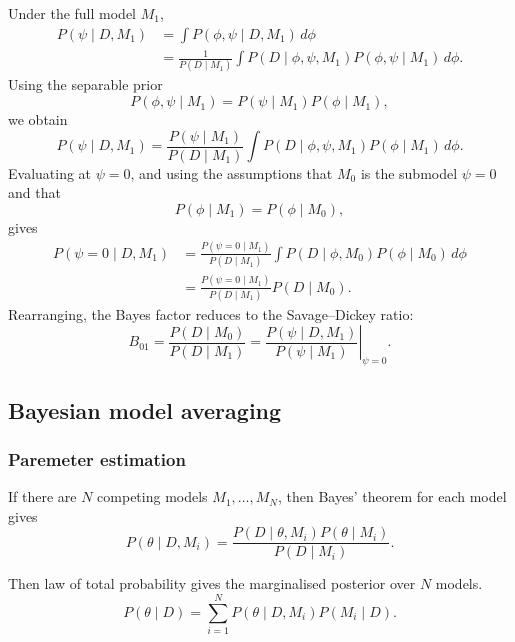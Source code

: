 \documentclass[11pt, titlepage]{article} %
\numberwithin{equation}{section}
\theoremstyle{definition}
\numberwithin{assumption}{section}
\begin{document}
Under the full model $M_1$,
\begin{align*}
    P(\psi\mid D,M_1)
    &= \int P(\phi,\psi\mid D,M_1)\,d\phi\\
    &= \frac{1}{P(D\mid M_1)}
       \int P(D\mid \phi,\psi,M_1)P(\phi,\psi\mid M_1)\,d\phi.
\end{align*}
Using the separable prior
\begin{equation*}
    P(\phi,\psi\mid M_1)=P(\psi\mid M_1)P(\phi\mid M_1),
\end{equation*}
we obtain
\begin{equation*}
    P(\psi\mid D,M_1)
    =
    \frac{P(\psi\mid M_1)}{P(D\mid M_1)}
    \int P(D\mid \phi,\psi,M_1)P(\phi\mid M_1)\,d\phi.
\end{equation*}
Evaluating at $\psi=0$, and using the assumptions that $M_0$ is the submodel $\psi=0$ and that
\begin{equation*}
    P(\phi\mid M_1)=P(\phi\mid M_0),
\end{equation*}
gives
\begin{align*}
    P(\psi=0\mid D,M_1)
    &=
    \frac{P(\psi=0\mid M_1)}{P(D\mid M_1)}
    \int P(D\mid \phi,M_0)P(\phi\mid M_0)\,d\phi\\
    &=
    \frac{P(\psi=0\mid M_1)}{P(D\mid M_1)}P(D\mid M_0).
\end{align*}
Rearranging, the Bayes factor reduces to the Savage--Dickey ratio:
\begin{equation*}
    B_{01}
    =
    \frac{P(D\mid M_0)}{P(D\mid M_1)}
    =
    \left.
    \frac{P(\psi\mid D,M_1)}{P(\psi\mid M_1)}
    \right|_{\psi=0}.
\end{equation*}




\subsection{Bayesian model averaging}
\subsubsection*{Paremeter estimation}

If there are $N$ competing models $M_1,\dots,M_N$, then Bayes' theorem for each model gives
\begin{equation*}
    P(\theta\mid D,M_i)=\frac{P(D\mid \theta,M_i)P(\theta\mid M_i)}{P(D\mid M_i)}.
\end{equation*}

Then law of total probability gives the marginalised posterior over $N$ models. 
\begin{equation*}
    P(\theta\mid D)
    =
    \sum_{i=1}^N P(\theta\mid D,M_i)P(M_i\mid D).
\end{equation*}
\end{document}
